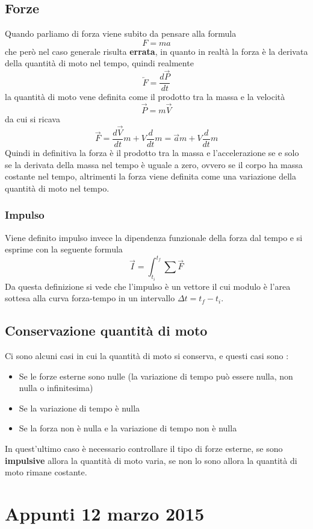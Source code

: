 \documentclass[portrait]{article}
\begin{document}
\subsection{Forze}
Quando parliamo di forza viene subito da pensare alla formula 
$$F = ma$$
che però nel caso generale risulta \textbf{errata}, in quanto in realtà la forza è la derivata della quantità di moto nel tempo, quindi realmente 
$$\overleftarrow{F} = \frac{d \overrightarrow{P}}{dt}$$
la quantità di moto vene definita come il prodotto tra la massa e  la velocità
$$\overrightarrow{P} = m\overrightarrow{V}$$
da cui si ricava 
$$\overrightarrow{F} = \frac{d\overrightarrow{V}}{dt}m + V\frac{d}{dt}m = \overrightarrow{a}m + V\frac{d}{dt}m$$
Quindi in definitiva la forza è il prodotto tra la massa e l'accelerazione se e solo se la derivata della massa nel tempo è uguale a zero, ovvero se il corpo ha massa costante nel tempo, altrimenti la forza viene definita come una variazione della quantità di moto nel tempo.
\subsubsection{Impulso}
Viene definito impulso invece la dipendenza funzionale della forza dal tempo e si esprime con la seguente formula
$$\overrightarrow{I} = \int_{t_i}^{t_f} \sum \overrightarrow{F}$$
Da questa definizione si vede che l'impulso è un vettore il cui modulo è l'area sottesa alla curva forza-tempo in un intervallo $\Delta t = t_f - t_i$.
\subsection{Conservazione quantità di moto}
Ci sono alcuni casi in cui la quantità di moto si conserva, e questi casi sono :
\begin{itemize}
\item Se le forze esterne sono nulle (la variazione di tempo può essere nulla, non nulla o infinitesima)
\item Se la variazione di tempo è nulla
\item Se la forza non è nulla e la variazione di tempo non è nulla
\end{itemize}
In quest'ultimo caso è necessario controllare il tipo di forze esterne, se sono \textbf{impulsive} allora la quantità di moto varia, se non lo sono allora la quantità di moto rimane costante.
\section{Appunti 12 marzo 2015}
\end{document}
